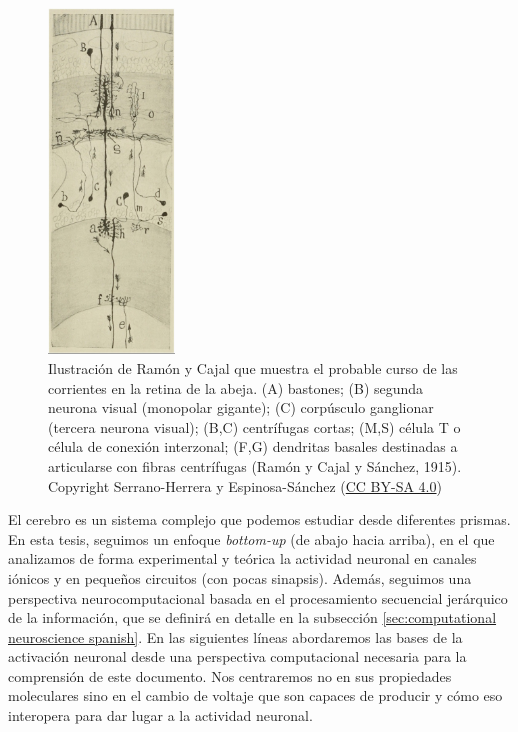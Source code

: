 \begin{figure}[htb!]
    \centering
    \includegraphics[width=0.3\textwidth]{img/intro/cajal-flow_small.jpg}
    \caption{Ilustración de Ramón y Cajal que muestra el probable curso de las corrientes en la retina de la abeja. (A) bastones; (B) segunda neurona visual (monopolar gigante); (C) corpúsculo ganglionar (tercera neurona visual); (B,C) centrífugas cortas; (M,S) célula T o célula de conexión interzonal; (F,G) dendritas basales destinadas a articularse con fibras centrífugas (Ramón y Cajal y Sánchez, 1915). Copyright Serrano-Herrera y Espinosa-Sánchez \cite{serrano-herrera_domingo_2024} (\href{https://creativecommons.org/licenses/by-sa/4.0/}{CC BY-SA 4.0})}
    \label{fig:cajal-neuron spanish}
\end{figure}

El cerebro es un sistema complejo que podemos estudiar desde diferentes prismas. En esta tesis, seguimos un enfoque \textit{bottom-up} (de abajo hacia arriba), en el que analizamos de forma experimental y teórica la actividad neuronal en canales iónicos y en pequeños circuitos (con pocas sinapsis). Además, seguimos una perspectiva neurocomputacional basada en el procesamiento secuencial jerárquico de la información, que se definirá en detalle en la subsección \ref{sec:computational neuroscience spanish}. En las siguientes líneas abordaremos las bases de la activación neuronal desde una perspectiva computacional necesaria para la comprensión de este documento. Nos centraremos no en sus propiedades moleculares sino en el cambio de voltaje que son capaces de producir y cómo eso interopera para dar lugar a la actividad neuronal.


